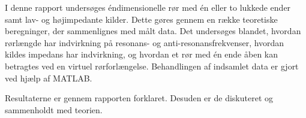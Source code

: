 I denne rapport undersøges éndimensionelle rør med én eller to lukkede ender samt lav- og højimpedante kilder. Dette gøres gennem en række teoretiske beregninger, der sammenlignes med målt data. Det undersøges blandet, hvordan rørlængde har indvirkning på resonans- og anti-resonansfrekvenser, hvordan kildes impedans har indvirkning, og hvordan et rør med én ende åben kan betragtes ved en virtuel rørforlængelse.
Behandlingen af indsamlet data er gjort ved hjælp af MATLAB.

Resultaterne er gennem rapporten forklaret. Desuden er de diskuteret og sammenholdt med teorien.